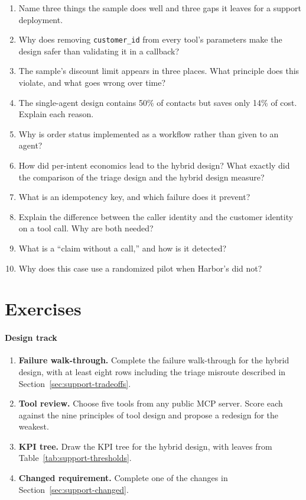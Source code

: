 \begin{enumerate}[itemsep=2pt]
  \item Name three things the sample does well and three gaps it leaves for a support deployment.
  \item Why does removing \texttt{customer\_id} from every tool's parameters make the design safer than validating it in a callback?
  \item The sample's discount limit appears in three places. What principle does this violate, and what goes wrong over time?
  \item The single-agent design contains 50\% of contacts but saves only 14\% of cost. Explain each reason.
  \item Why is order status implemented as a workflow rather than given to an agent?
  \item How did per-intent economics lead to the hybrid design? What exactly did the comparison of the triage design and the hybrid design measure?
  \item What is an idempotency key, and which failure does it prevent?
  \item Explain the difference between the caller identity and the customer identity on a tool call. Why are both needed?
  \item What is a ``claim without a call,'' and how is it detected?
  \item Why does this case use a randomized pilot when Harbor's did not?
\end{enumerate}

\section*{Exercises}

\paragraph{Design track}
\begin{enumerate}[itemsep=2pt]
  \item \textbf{Failure walk-through.} Complete the failure walk-through for the hybrid design, with at least eight rows including the triage misroute described in Section~\ref{sec:support-tradeoffs}.
  \item \textbf{Tool review.} Choose five tools from any public MCP server. Score each against the nine principles of tool design and propose a redesign for the weakest.
  \item \textbf{KPI tree.} Draw the KPI tree for the hybrid design, with leaves from Table~\ref{tab:support-thresholds}.
  \item \textbf{Changed requirement.} Complete one of the changes in Section~\ref{sec:support-changed}.
\end{enumerate}

